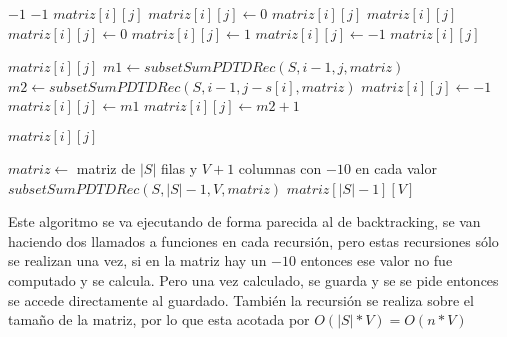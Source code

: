 \documentclass[a4paper]{article}
\begin{document}
\begin{algorithm}
\begin{algorithmic}
	 
			\State \Return $-1$
		\EndIf
			\State \Return $-1$
		\EndIf
				\State \Return $matriz[i][j]$
			\Else
				\State $matriz[i][j] \gets 0$
				\State \Return $matriz[i][j]$
			\EndIf
		\EndIf
				\State \Return $matriz[i][j]$
			\Else
					\State $matriz[i][j] \gets 0$			
				\Else
						\State $matriz[i][j] \gets 1$
					\Else
						\State $matriz[i][j] \gets -1$
					\EndIf
				\EndIf
				\State \Return $matriz[i][j]$
			\EndIf
		\EndIf
		
			\State \Return $matriz[i][j]$
		\Else
			\State $m1 \gets subsetSumPDTDRec(S, i-1, j, matriz)$ 
			\State $m2 \gets subsetSumPDTDRec(S, i-1, j - s[i], matriz)$ 
				\State $matriz[i][j] \gets -1$
			\Else
					\State $matriz[i][j] \gets m1$
				\Else
					\State $matriz[i][j] \gets m2 + 1$ 
				\EndIf
			\EndIf
			
			\State \Return $matriz[i][j]$
		\EndIf
	\EndProcedure
\end{algorithmic}
\end{algorithm}

\begin{algorithm}
\begin{algorithmic}
		\State $matriz \gets$ matriz de $|S|$ filas y $V+1$ columnas con $-10$ en cada valor 
		\State $subsetSumPDTDRec(S, |S|-1, V, matriz)$ 
		\State \Return $matriz[|S|-1][V]$
	\EndProcedure
\end{algorithmic}
\end{algorithm}

\pagebreak

Este algoritmo se va ejecutando de forma parecida al de backtracking, se van haciendo dos llamados a funciones en cada recursión, pero estas recursiones sólo se realizan una vez, si en la matriz hay un $-10$ entonces ese valor no fue computado y se calcula. Pero una vez calculado, se guarda y se se pide entonces se accede directamente al guardado. También la recursión se realiza sobre el tamaño de la matriz, por lo que esta acotada por $O(|S|*V) = O(n*V)$
\end{document}
